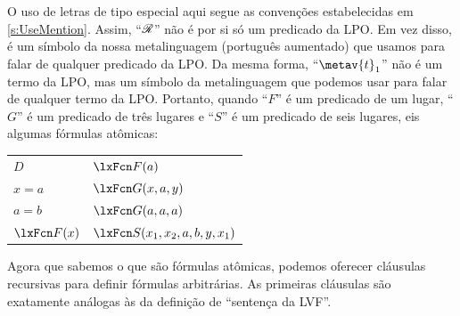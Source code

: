 O uso de letras de tipo especial aqui segue as convenções estabelecidas em \cref{s:UseMention}. Assim, \textquotedblleft $\mathscr{R}$\textquotedblright{} não é por si só um predicado da LPO. Em vez disso, é um símbolo da nossa metalinguagem (português aumentado) que usamos para falar de qualquer predicado da LPO. Da mesma forma, \textquotedblleft $\metav{t}_1$\textquotedblright{} não é um termo da LPO, mas um símbolo da metalinguagem que podemos usar para falar de qualquer termo da LPO. Portanto, quando \textquotedblleft $F$\textquotedblright{} é um predicado de um lugar, \textquotedblleft $G$\textquotedblright{} é um predicado de três lugares e \textquotedblleft $S$\textquotedblright{} é um predicado de seis lugares, eis algumas fórmulas atômicas:
	\begin{center}
		\begin{tabular}{l@{\qquad\qquad}l}
		$D$ & $\atom{F}{a}$\\
		$x = a$ & $\atom{G}{x,a,y}$\\
		$a = b$ & $\atom{G}{a,a,a}$\\
		$\atom{F}{x}$ & $\atom{S}{x_1, x_2, a, b, y, x_1}$
	\end{tabular}
\end{center}
Agora que sabemos o que são fórmulas atômicas, podemos oferecer cláusulas recursivas para definir fórmulas arbitrárias. As primeiras cláusulas são exatamente análogas às da definição de \textquotedblleft sentença da LVF\textquotedblright{}.
